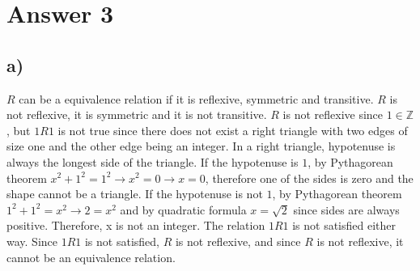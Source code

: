\documentclass[12pt]{article}
\newcommand{\+}{\mkern2mu}
\begin{document}
\section*{Answer 3}
\subsection*{a) }
$R$ can be a equivalence relation if it is reflexive, symmetric and transitive.
$R$ is not reflexive, it is symmetric and it is not transitive.
$R$ is not reflexive since $1 \in \mathbb{Z}$, but $1R1$ is not true since there does not exist a right triangle with two edges of size one and the other edge being an integer.
In a right triangle, hypotenuse is always the longest side of the triangle.
If the hypotenuse is $1$, by Pythagorean theorem $x^2 + 1^2 = 1^2 \to x^2 = 0 \to x = 0$, therefore one of the sides is zero and the shape cannot be a triangle.
If the hypotenuse is not $1$, by Pythagorean theorem $1^2 + 1^2 = x^2 \to 2 = x^2$ and by quadratic formula $x=\sqrt{2}$ since sides are always positive.
Therefore, x is not an integer.
The relation $1R1$ is not satisfied either way.
Since $1R1$ is not satisfied, $R$ is not reflexive, and since $R$ is not reflexive, it cannot be an equivalence relation.
\end{document}
